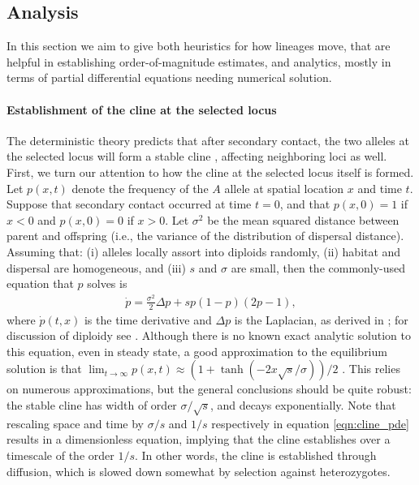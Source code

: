 \documentclass[11pt,letterpaper]{article}
\newcommand{\alisa}[1]{{\em \color{red} #1}}
\newcommand{\plr}[1]{{\em \color{blue} #1}}
\begin{document}


\subsection*{Analysis}

In this section we aim to give both heuristics for how lineages move, 
that are helpful in establishing order-of-magnitude estimates,
and analytics, mostly in terms of partial differential equations needing numerical solution.

\paragraph{Establishment of the cline at the selected locus}
The deterministic theory predicts that after secondary contact,
the two alleles at the selected locus will form a stable cline \citep{Barton1979},
affecting neighboring loci as well.
First, we turn our attention to how the cline at the selected locus itself is formed.
Let $p(x,t)$ denote the frequency of the $A$ allele at spatial location $x$ and time $t$.  
Suppose that secondary contact occurred at time $t=0$, 
and that $p(x,0) = 1$ if $x<0$ and $p(x,0)=0$ if $x>0$.
Let $\sigma^2$ be the mean squared distance between parent and offspring 
(i.e., the variance of the distribution of dispersal distance).
Assuming that: (i) alleles locally assort into diploids randomly, 
(ii) habitat and dispersal are homogeneous, and 
(iii) $s$ and $\sigma$ are small, then the commonly-used equation that $p$ solves is
\begin{align} \label{eqn:cline_pde}
    \dot p = \frac{\sigma^2}{2} \Delta p + s p (1-p) (2p-1) ,
\end{align}
where $\dot p(t,x)$ is the time derivative and $\Delta p$ is the Laplacian,
as derived in \citet{Bazykin1969}; for discussion of diploidy see \citep{christiansen1995genotypic}.
Although there is no known exact analytic solution to this equation, even in steady state, 
a good approximation to the equilibrium solution is that
$\lim_{t \to \infty} p(x,t) \approx (1+\tanh(-2x\sqrt{s}/\sigma))/2$ \citep{Bazykin1969}. 
This relies on numerous approximations, but the general conclusions should be quite robust: 
the stable cline has width of order $\sigma/\sqrt{s}$, and decays exponentially. 
Note that rescaling space and time by $\sigma/s$ and $1/s$ respectively in equation \eqref{eqn:cline_pde} results in a dimensionless equation,
implying that the cline establishes over a timescale of the order $1/s$. 
In other words, the cline is established through diffusion, which is slowed down somewhat by selection against heterozygotes. 
\end{document}
